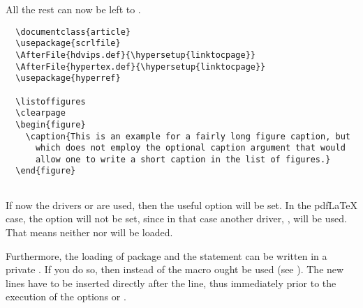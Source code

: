 \begin{Example}
All the rest can now be left to .
\begin{lstlisting}
  \documentclass{article}
  \usepackage{scrlfile}
  \AfterFile{hdvips.def}{\hypersetup{linktocpage}}
  \AfterFile{hypertex.def}{\hypersetup{linktocpage}}
  \usepackage{hyperref}
  
  \listoffigures
  \clearpage
  \begin{figure}
    \caption{This is an example for a fairly long figure caption, but
      which does not employ the optional caption argument that would
      allow one to write a short caption in the list of figures.}
  \end{figure}
  
\end{lstlisting}
If now the  drivers  or
 are used, then the useful  option
 will be set. In the pdf\LaTeX{} case, the option
will not be set, since in that case another  driver,
, will be used. That means neither 
nor  will be loaded.
\end{Example}

\begin{Explain}
  Furthermore, the loading of package  and the
   statement can be written in a private
  .  If you do so, then instead of
   the macro  ought be used
  (see \cite{latex:clsguide}).  The new lines have to be inserted
  directly after the  line, thus immediately prior
  to the execution of the options  or .
\end{Explain}%

